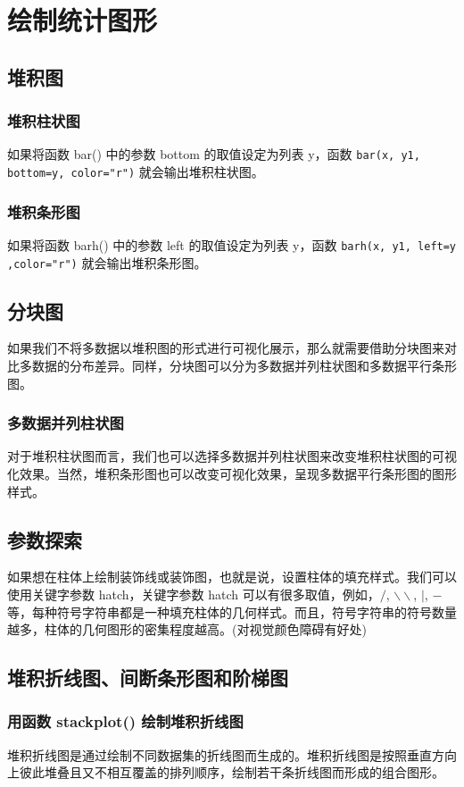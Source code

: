 \chapter{绘制统计图形\label{ch03}}
\section{堆积图}
\subsection{堆积柱状图}
如果将函数 bar() 中的参数 bottom 的取值设定为列表 y，函数 \verb|bar(x, y1, bottom=y, color="r")| 就会输出堆积柱状图。
\subsection{堆积条形图}
如果将函数 barh() 中的参数 left 的取值设定为列表 y，函数 \verb|barh(x, y1, left=y ,color="r")| 就会输出堆积条形图。
\section{分块图}
如果我们不将多数据以堆积图的形式进行可视化展示，那么就需要借助分块图来对比多数据的分布差异。同样，分块图可以分为多数据并列柱状图和多数据平行条形图。
\subsection{多数据并列柱状图}
对于堆积柱状图而言，我们也可以选择多数据并列柱状图来改变堆积柱状图的可视化效果。当然，堆积条形图也可以改变可视化效果，呈现多数据平行条形图的图形样式。
\section{参数探索}
如果想在柱体上绘制装饰线或装饰图，也就是说，设置柱体的填充样式。我们可以使用关键字参数 hatch，关键字参数 hatch 可以有很多取值，例如，$/$, $\backslash\backslash$, $|$, $-$等，每种符号字符串都是一种填充柱体的几何样式。而且，符号字符串的符号数量越多，柱体的几何图形的密集程度越高。(对视觉颜色障碍有好处)
\section{堆积折线图、间断条形图和阶梯图}
\subsection{用函数 stackplot() 绘制堆积折线图}
堆积折线图是通过绘制不同数据集的折线图而生成的。堆积折线图是按照垂直方向上彼此堆叠且又不相互覆盖的排列顺序，绘制若干条折线图而形成的组合图形。
